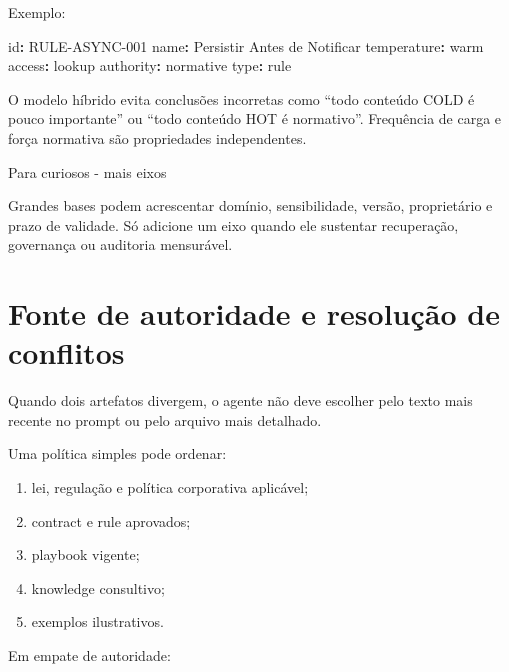 \documentclass[
  10pt,
  a4paper,
  oneside]{book}
\newenvironment{Shaded}{}{}
\newcommand{\AttributeTok}[1]{\textcolor[rgb]{0.49,0.56,0.16}{#1}}
\newcommand{\FunctionTok}[1]{\textcolor[rgb]{0.02,0.16,0.49}{#1}}
\newcommand{\KeywordTok}[1]{\textcolor[rgb]{0.00,0.44,0.13}{\textbf{#1}}}
\providecommand{\tightlist}{%
  \setlength{\itemsep}{0pt}\setlength{\parskip}{0pt}}
\begin{document}
Exemplo:

\begin{Shaded}
\begin{Highlighting}[]
\FunctionTok{id}\KeywordTok{:}\AttributeTok{ RULE{-}ASYNC{-}001}
\FunctionTok{name}\KeywordTok{:}\AttributeTok{ Persistir Antes de Notificar}
\FunctionTok{temperature}\KeywordTok{:}\AttributeTok{ warm}
\FunctionTok{access}\KeywordTok{:}\AttributeTok{ lookup}
\FunctionTok{authority}\KeywordTok{:}\AttributeTok{ normative}
\FunctionTok{type}\KeywordTok{:}\AttributeTok{ rule}
\end{Highlighting}
\end{Shaded}

O modelo híbrido evita conclusões incorretas como ``todo conteúdo COLD é
pouco importante'' ou ``todo conteúdo HOT é normativo''. Frequência de
carga e força normativa são propriedades independentes.

\begin{curiousbox}{Para curiosos - mais eixos}

Grandes bases podem acrescentar domínio, sensibilidade, versão,
proprietário e prazo de validade. Só adicione um eixo quando ele
sustentar recuperação, governança ou auditoria mensurável.

\end{curiousbox}

\hypertarget{fonte-de-autoridade-e-resoluuxe7uxe3o-de-conflitos}{%
\section{Fonte de autoridade e resolução de
conflitos}\label{fonte-de-autoridade-e-resoluuxe7uxe3o-de-conflitos}}

Quando dois artefatos divergem, o agente não deve escolher pelo texto
mais recente no prompt ou pelo arquivo mais detalhado.

Uma política simples pode ordenar:

\begin{enumerate}
\def\labelenumi{\arabic{enumi}.}
\tightlist
\item
  lei, regulação e política corporativa aplicável;
\item
  contract e rule aprovados;
\item
  playbook vigente;
\item
  knowledge consultivo;
\item
  exemplos ilustrativos.
\end{enumerate}

Em empate de autoridade:
\end{document}
